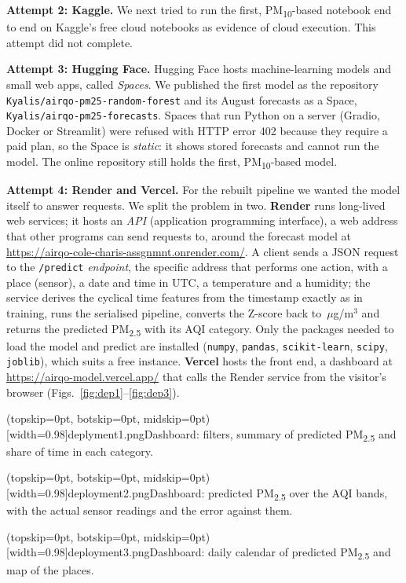 \documentclass{ieeeaccess}
\newcommand{\ugm}{\,$\mu$g/m$^{3}$}
\newcommand{\pmtwo}{PM\textsubscript{2.5}}
\newcommand{\pmten}{PM\textsubscript{10}}
\begin{document}
\textbf{Attempt 2: Kaggle.} We next tried to run the first, \pmten{}-based notebook end to end on Kaggle's free cloud notebooks as evidence of cloud execution. This attempt did not complete.

\textbf{Attempt 3: Hugging Face.} Hugging Face hosts machine-learning models and small web apps, called \emph{Spaces}. We published the first model as the repository \texttt{Kyalis/\allowbreak airqo-pm25-\allowbreak random-forest} and its August forecasts as a Space, \texttt{Kyalis/\allowbreak airqo-pm25-\allowbreak forecasts}. Spaces that run Python on a server (Gradio, Docker or Streamlit) were refused with HTTP error 402 because they require a paid plan, so the Space is \emph{static}: it shows stored forecasts and cannot run the model. The online repository still holds the first, \pmten{}-based model.

\textbf{Attempt 4: Render and Vercel.} For the rebuilt pipeline we wanted the model itself to answer requests. We split the problem in two. \textbf{Render} runs long-lived web services; it hosts an \emph{API} (application programming interface), a web address that other programs can send requests to, around the forecast model at \url{https://airqo-cole-charis-assgnmnt.onrender.com/}. A client sends a JSON request to the \texttt{/predict} \emph{endpoint}, the specific address that performs one action, with a place (sensor), a date and time in UTC, a temperature and a humidity; the service derives the cyclical time features from the timestamp exactly as in training, runs the serialised pipeline, converts the Z-score back to \ugm{} and returns the predicted \pmtwo{} with its AQI category. Only the packages needed to load the model and predict are installed (\texttt{numpy}, \texttt{pandas}, \texttt{scikit-learn}, \texttt{scipy}, \texttt{joblib}), which suits a free instance. \textbf{Vercel} hosts the front end, a dashboard at \url{https://airqo-model.vercel.app/} that calls the Render service from the visitor's browser (Figs.~\ref{fig:dep1}--\ref{fig:dep3}).

\Figure[t!](topskip=0pt, botskip=0pt, midskip=0pt)[width=0.98\columnwidth]{deplyment1.png}{Dashboard: filters, summary of predicted \pmtwo{} and share of time in each category.\label{fig:dep1}}

\Figure[t!](topskip=0pt, botskip=0pt, midskip=0pt)[width=0.98\columnwidth]{deployment2.png}{Dashboard: predicted \pmtwo{} over the AQI bands, with the actual sensor readings and the error against them.\label{fig:dep2}}

\Figure[t!](topskip=0pt, botskip=0pt, midskip=0pt)[width=0.98\columnwidth]{deployment3.png}{Dashboard: daily calendar of predicted \pmtwo{} and map of the places.\label{fig:dep3}}
\end{document}
